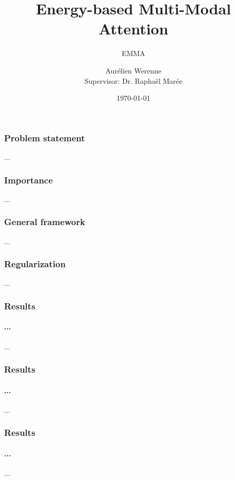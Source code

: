 \documentclass[10pt]{beamer}
\title[EMMA]{Energy-based Multi-Modal Attention} %
\subtitle{EMMA}
\author[Aurélien Werenne]{Aurélien Werenne \\ {\small Supervisor: Dr. Raphaël Marée}}
\institute[ULiège] 
{
\begin{figure}
\texttt{[image: figs/logo-uliege]}
\end{figure}
\medskip
}
\date{\today}
\begin{document}
\begin{frame}
\titlepage 
\end{frame}

\begin{frame}
\frametitle{Problem statement}
...
\end{frame}

\begin{frame}
\frametitle{Importance}
...
\end{frame}

\begin{frame}
\frametitle{General framework}
...
\end{frame}

\begin{frame}
\frametitle{Regularization}
...
\end{frame}

\begin{frame}
\frametitle{Results}
\framesubtitle{...}
...
\end{frame}

\begin{frame}
\frametitle{Results}
\framesubtitle{...}
...
\end{frame}

\begin{frame}
\frametitle{Results}
\framesubtitle{...}
...
\end{frame}


\end{document}
